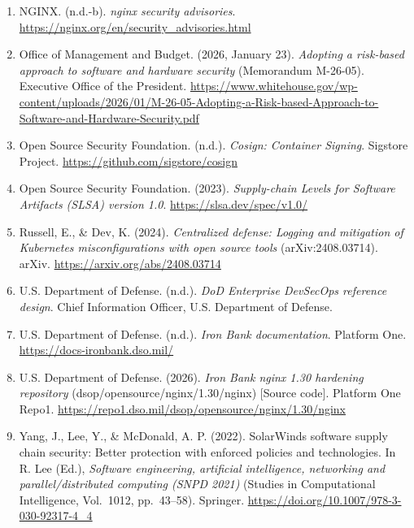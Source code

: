 \documentclass[10pt,letterpaper,twocolumn]{article}
\begin{document}
{\begin{enumerate}[label=\arabic*.,leftmargin=*,itemsep=1pt,parsep=0pt,topsep=2pt]
\item NGINX. (n.d.-b). \textit{nginx security advisories}. \url{https://nginx.org/en/security_advisories.html}
\item Office of Management and Budget. (2026, January 23). \textit{Adopting a risk-based approach to software and hardware security} (Memorandum M-26-05). Executive Office of the President. \url{https://www.whitehouse.gov/wp-content/uploads/2026/01/M-26-05-Adopting-a-Risk-based-Approach-to-Software-and-Hardware-Security.pdf}
\item Open Source Security Foundation. (n.d.). \textit{Cosign: Container Signing}. Sigstore Project. \url{https://github.com/sigstore/cosign}
\item Open Source Security Foundation. (2023). \textit{Supply-chain Levels for Software Artifacts (SLSA) version 1.0}. \url{https://slsa.dev/spec/v1.0/}
\item Russell, E., \& Dev, K. (2024). \textit{Centralized defense: Logging and mitigation of Kubernetes misconfigurations with open source tools} (arXiv:2408.03714). arXiv. \url{https://arxiv.org/abs/2408.03714}
\item U.S. Department of Defense. (n.d.). \textit{DoD Enterprise DevSecOps reference design}. Chief Information Officer, U.S. Department of Defense.
\item U.S. Department of Defense. (n.d.). \textit{Iron Bank documentation}. Platform One. \url{https://docs-ironbank.dso.mil/}
\item U.S. Department of Defense. (2026). \textit{Iron Bank nginx 1.30 hardening repository} (dsop/opensource/nginx/1.30/nginx) [Source code]. Platform One Repo1. \url{https://repo1.dso.mil/dsop/opensource/nginx/1.30/nginx}
\item Yang, J., Lee, Y., \& McDonald, A. P. (2022). SolarWinds software supply chain security: Better protection with enforced policies and technologies. In R. Lee (Ed.), \textit{Software engineering, artificial intelligence, networking and parallel/distributed computing (SNPD 2021)} (Studies in Computational Intelligence, Vol.~1012, pp.~43--58). Springer. \url{https://doi.org/10.1007/978-3-030-92317-4_4}
\end{enumerate}
}
\end{document}
